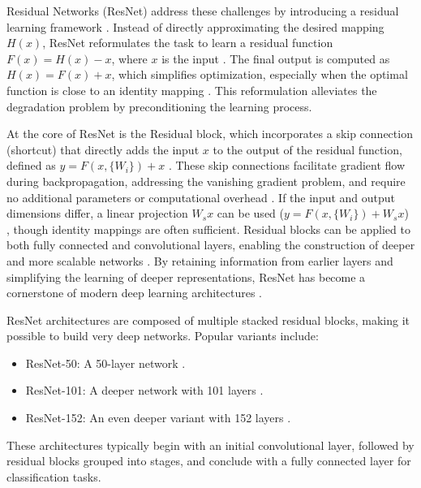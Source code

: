 Residual Networks (ResNet) address these challenges by introducing a residual learning framework \cite{he2015deepresiduallearningimage}. Instead of directly approximating the desired mapping \( H(x) \), ResNet reformulates the task to learn a residual function \( F(x) = H(x) - x \), where \( x \) is the input \cite{he2015deepresiduallearningimage}. The final output is computed as \( H(x) = F(x) + x \), which simplifies optimization, especially when the optimal function is close to an identity mapping \cite{he2015deepresiduallearningimage}. This reformulation alleviates the degradation problem by preconditioning the learning process. 

At the core of ResNet is the Residual block, which incorporates a skip connection (shortcut) that directly adds the input \( x \) to the output of the residual function, defined as \( y = F(x, \{W_i\}) + x \) \cite{he2015deepresiduallearningimage}. These skip connections facilitate gradient flow during backpropagation, addressing the vanishing gradient problem, and require no additional parameters or computational overhead \cite{he2015deepresiduallearningimage}. If the input and output dimensions differ, a linear projection \( W_sx \) can be used (\( y = F(x, \{W_i\}) + W_sx \)) \cite{he2015deepresiduallearningimage}, though identity mappings are often sufficient. Residual blocks can be applied to both fully connected and convolutional layers, enabling the construction of deeper and more scalable networks \cite{he2015deepresiduallearningimage}. By retaining information from earlier layers and simplifying the learning of deeper representations, ResNet has become a cornerstone of modern deep learning architectures \cite{he2015deepresiduallearningimage}.

ResNet architectures are composed of multiple stacked residual blocks, making it possible to build very deep networks. Popular variants include:
\begin{itemize}
    \item ResNet-50: A 50-layer network \cite{he2015deepresiduallearningimage}.
    \item ResNet-101: A deeper network with 101 layers \cite{he2015deepresiduallearningimage}.
    \item ResNet-152: An even deeper variant with 152 layers \cite{he2015deepresiduallearningimage}.
\end{itemize}


These architectures typically begin with an initial convolutional layer, followed by residual blocks grouped into stages, and conclude with a fully connected layer for classification tasks. 

